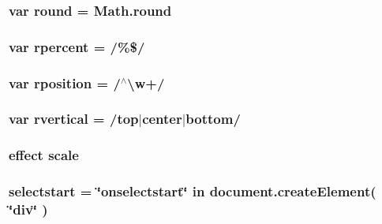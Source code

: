 \hypertarget{jquery-ui_8js_abcf15bd0ceed587926978d51b71f3c85}{
\subsubsection[{round}]{\setlength{\rightskip}{0pt plus 5cm}var round = Math.\+round}}\label{jquery-ui_8js_abcf15bd0ceed587926978d51b71f3c85}
\hypertarget{jquery-ui_8js_a972692753fec468a0f83c075737e9ee9}{
\subsubsection[{rpercent}]{\setlength{\rightskip}{0pt plus 5cm}var rpercent = /\%\$/}}\label{jquery-ui_8js_a972692753fec468a0f83c075737e9ee9}
\hypertarget{jquery-ui_8js_a6fb8fe7ab54a3d21b306a7343606fe04}{
\subsubsection[{rposition}]{\setlength{\rightskip}{0pt plus 5cm}var rposition = /$^\wedge$\textbackslash{}w+/}}\label{jquery-ui_8js_a6fb8fe7ab54a3d21b306a7343606fe04}
\hypertarget{jquery-ui_8js_a7a049cd958f2c4c7811735ecc68acb99}{
\subsubsection[{rvertical}]{\setlength{\rightskip}{0pt plus 5cm}var rvertical = /top$\vert$center$\vert$bottom/}}\label{jquery-ui_8js_a7a049cd958f2c4c7811735ecc68acb99}
\hypertarget{jquery-ui_8js_ae76f9579840035746898242271683379}{
\subsubsection[{scale}]{ effect scale}}\label{jquery-ui_8js_ae76f9579840035746898242271683379}
\hypertarget{jquery-ui_8js_ad37f03bb64f02fb08935aeb5529075cb}{
\subsubsection[{selectstart}]{ selectstart = \char`\"{}onselectstart\char`\"{} in document.\+create\+Element( \char`\"{}div\char`\"{} )}}\label{jquery-ui_8js_ad37f03bb64f02fb08935aeb5529075cb}
